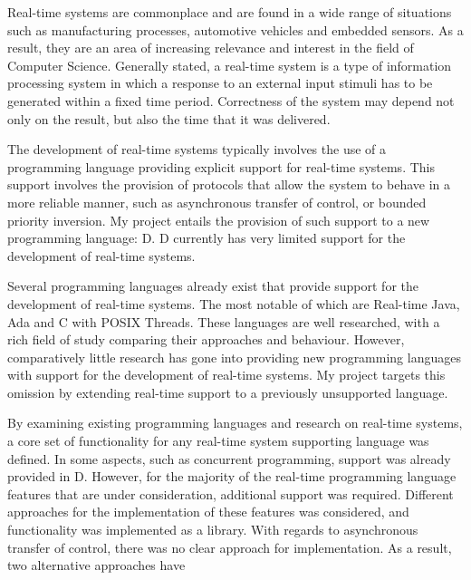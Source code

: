 
Real-time systems are commonplace and are found in a wide range of 
situations such as manufacturing processes, automotive vehicles and embedded 
sensors. As a result, they are an area of increasing relevance and interest in the field 
of Computer Science. Generally stated, a real-time system is a type of information 
processing system in which a response to an external input stimuli 
has to be generated within a fixed time period. Correctness of the 
system may depend not only on the result, but also the time that it was delivered. 
\par\bigskip\noindent
The development of real-time systems typically involves the use of a programming 
language providing explicit support for real-time systems. 
This support involves the provision of protocols that allow the system to 
behave in a more reliable manner, such as asynchronous transfer of control, or 
bounded priority inversion. 
My project entails the provision of such support to a new programming language: 
D. D currently has very limited support for the development of real-time systems. 
\par\bigskip\noindent
Several programming languages already exist that provide support for the 
development of real-time systems. The most notable of which are 
Real-time Java, Ada and C with POSIX Threads. These languages are well researched, 
with a rich field of study comparing their approaches and behaviour. 
However, comparatively little research has gone into providing new programming 
languages with support for the development of real-time systems. My project 
targets this omission by extending real-time support to a previously unsupported 
language.
\par\bigskip\noindent
By examining existing programming languages and research on real-time systems, a core set 
of functionality for any real-time system supporting language was defined. 
In some aspects, such as concurrent programming, support was already provided in D. 
However, for the majority of the real-time programming language features that
are under consideration, additional support was required. 
Different approaches for the implementation of these features was considered, and 
functionality was implemented as a library. 
With regards to asynchronous transfer of control, there was no clear 
approach for implementation. As a result, two alternative approaches have 
